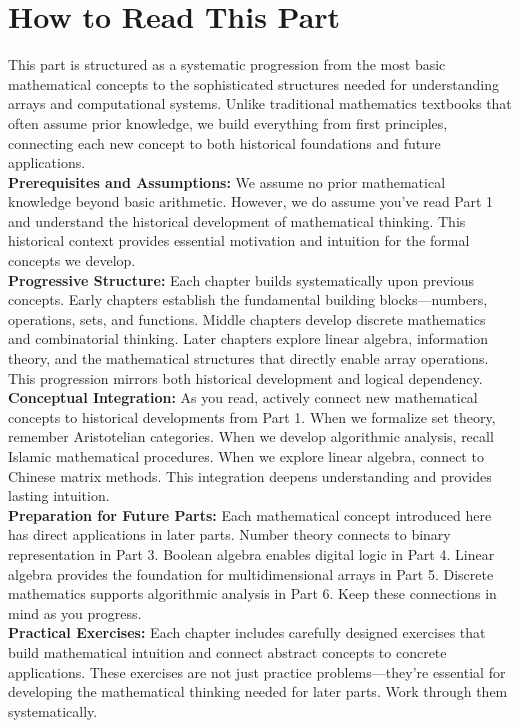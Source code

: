 \newpage
\section*{How to Read This Part}

This part is structured as a systematic progression from the most basic mathematical concepts to the sophisticated structures needed for understanding arrays and computational systems. Unlike traditional mathematics textbooks that often assume prior knowledge, we build everything from first principles, connecting each new concept to both historical foundations and future applications.\\
\textbf{Prerequisites and Assumptions:} We assume no prior mathematical knowledge beyond basic arithmetic. However, we do assume you've read Part 1 and understand the historical development of mathematical thinking. This historical context provides essential motivation and intuition for the formal concepts we develop.\\
\textbf{Progressive Structure:} Each chapter builds systematically upon previous concepts. Early chapters establish the fundamental building blocks—numbers, operations, sets, and functions. Middle chapters develop discrete mathematics and combinatorial thinking. Later chapters explore linear algebra, information theory, and the mathematical structures that directly enable array operations. This progression mirrors both historical development and logical dependency.\\
\textbf{Conceptual Integration:} As you read, actively connect new mathematical concepts to historical developments from Part 1. When we formalize set theory, remember Aristotelian categories. When we develop algorithmic analysis, recall Islamic mathematical procedures. When we explore linear algebra, connect to Chinese matrix methods. This integration deepens understanding and provides lasting intuition.\\
\textbf{Preparation for Future Parts:} Each mathematical concept introduced here has direct applications in later parts. Number theory connects to binary representation in Part 3. Boolean algebra enables digital logic in Part 4. Linear algebra provides the foundation for multidimensional arrays in Part 5. Discrete mathematics supports algorithmic analysis in Part 6. Keep these connections in mind as you progress.\\
\textbf{Practical Exercises:} Each chapter includes carefully designed exercises that build mathematical intuition and connect abstract concepts to concrete applications. These exercises are not just practice problems—they're essential for developing the mathematical thinking needed for later parts. Work through them systematically.\\
